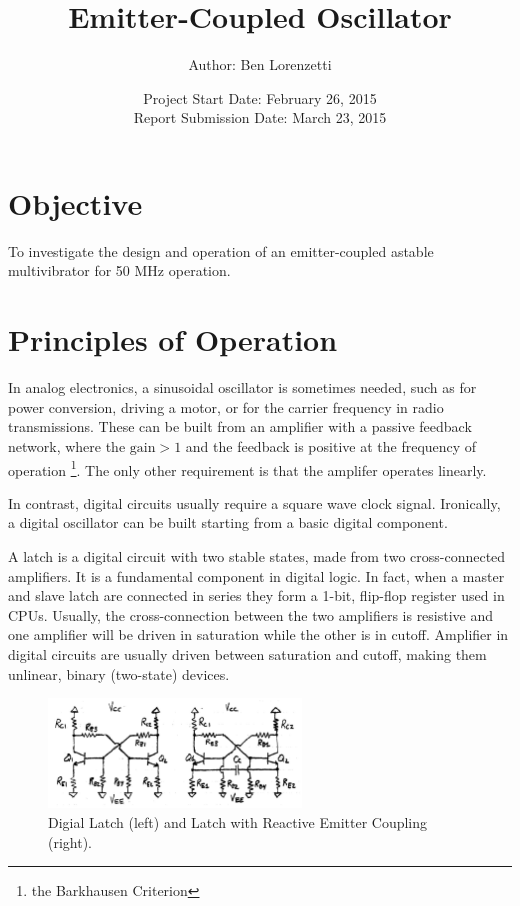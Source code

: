 \documentclass[titlepage, letterpaper, 10.5pt]{article}
\begin{document}
\title{Emitter-Coupled Oscillator}
\author{Author: Ben Lorenzetti}
\date{Project Start Date: February 26, 2015\\
Report Submission Date: March 23, 2015}
\maketitle

\clearpage
\mbox{}
\thispagestyle{empty}
\clearpage
\setcounter{page}{1}

\tableofcontents

\section{Objective}

To investigate the design and operation of an emitter-coupled astable multivibrator for 50
MHz operation.

\clearpage
\section{Principles of Operation}

In analog electronics, a sinusoidal oscillator is sometimes needed,
such as for power conversion, driving a motor, or for the carrier frequency in radio transmissions.
These can be built from an amplifier with a passive feedback network,
where the $\textrm{gain}>1$ and the feedback is positive at the frequency of operation
\footnote{the Barkhausen Criterion}.
The only other requirement is that the amplifer operates linearly.

In contrast, digital circuits usually require a square wave clock signal.
Ironically, a digital oscillator can be built starting from a basic digital component.

A latch is a digital circuit with two stable states, made from two cross-connected amplifiers.
It is a fundamental component in digital logic.
In fact, when a master and slave latch are connected in series they form a 1-bit, flip-flop register used in CPUs.
Usually, the cross-connection between the two amplifiers is resistive and one amplifier
will be driven in saturation while the other is in cutoff.
Amplifier in digital circuits are usually driven between saturation and cutoff,
making them unlinear, binary (two-state) devices.

\begin{figure}[ht]
	\centering
	\includegraphics[width=0.6\textwidth]{diagrams/latches.png}
	\caption{Digial Latch (left) and Latch with Reactive Emitter Coupling (right).}
	\label{latches}
\end{figure}
\end{document}
